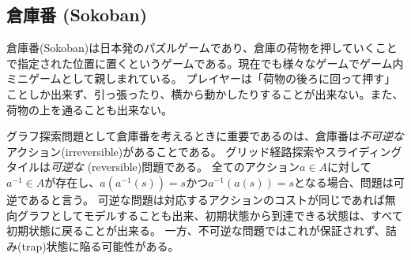 \documentclass{report}
\begin{document}
\begin{figure}
\centering
{} \hspace{4pt}
 \hspace{4pt}
\end{figure}



\subsection{倉庫番 (Sokoban)}
倉庫番(Sokoban)は日本発のパズルゲームであり、倉庫の荷物を押していくことで指定された位置に置くというゲームである。現在でも様々なゲームでゲーム内ミニゲームとして親しまれている。
プレイヤーは「荷物の後ろに回って押す」ことしか出来ず、引っ張ったり、横から動かしたりすることが出来ない。また、荷物の上を通ることも出来ない。

グラフ探索問題として倉庫番を考えるときに重要であるのは、倉庫番は{\it 不可逆な}アクション(irreversible)があることである。
グリッド経路探索やスライディングタイルは{\it 可逆な} (reversible)問題である。
全てのアクション$a \in A$に対して$a^{-1} \in A$が存在し、$a(a^{-1}(s)) = s$かつ$a^{-1}(a(s)) = s$となる場合、問題は可逆であると言う。
可逆な問題は対応するアクションのコストが同じであれば無向グラフとしてモデルすることも出来、初期状態から到達できる状態は、すべて初期状態に戻ることが出来る。
一方、不可逆な問題ではこれが保証されず、詰み(trap)状態に陥る可能性がある。
\end{document}
